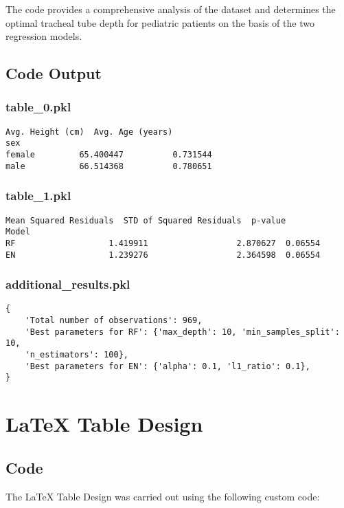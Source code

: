\documentclass[11pt]{article}
\begin{document}
The code provides a comprehensive analysis of the dataset and determines the optimal tracheal tube depth for pediatric patients on the basis of the two regression models.

\subsection{Code Output}

\subsubsection*{table\_0.pkl}

\begin{Verbatim}[tabsize=4]
        Avg. Height (cm)  Avg. Age (years)
sex
female         65.400447          0.731544
male           66.514368          0.780651
\end{Verbatim}

\subsubsection*{table\_1.pkl}

\begin{Verbatim}[tabsize=4]
       Mean Squared Residuals  STD of Squared Residuals  p-value
Model
RF                   1.419911                  2.870627  0.06554
EN                   1.239276                  2.364598  0.06554
\end{Verbatim}

\subsubsection*{additional\_results.pkl}

\begin{Verbatim}[tabsize=4]
{
    'Total number of observations': 969,
    'Best parameters for RF': {'max_depth': 10, 'min_samples_split': 10,
	'n_estimators': 100},
    'Best parameters for EN': {'alpha': 0.1, 'l1_ratio': 0.1},
}
\end{Verbatim}

\section{LaTeX Table Design}
\subsection{{Code}}
The LaTeX Table Design was carried out using the following custom code:
\end{document}
